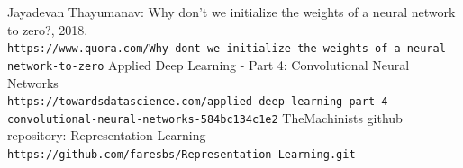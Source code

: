 \documentclass[a4paper]{article}
\begin{document}
 \newpage
\begin{thebibliography}{9}
  Jayadevan Thayumanav: Why don't we initialize the weights of a neural network to zero?, 2018.
  \\\texttt{https://www.quora.com/Why-dont-we-initialize-the-weights-of-a-neural-network-to-zero}
  Applied Deep Learning - Part 4: Convolutional Neural Networks
  \\\texttt{https://towardsdatascience.com/applied-deep-learning-part-4-convolutional-neural-networks-584bc134c1e2}
  TheMachinists github repository: Representation-Learning
  \\\texttt{https://github.com/faresbs/Representation-Learning.git}
\end{thebibliography}
\end{document}

